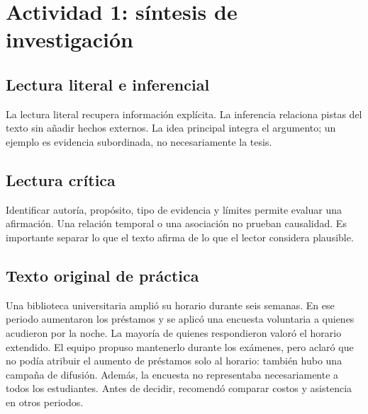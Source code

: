 \def\uadectitulo{Comprensión lectora}


\portadaUAdeC
\section{Actividad 1: síntesis de investigación}
\subsection{Lectura literal e inferencial}
La lectura literal recupera información explícita. La inferencia relaciona pistas del texto sin añadir hechos externos. La idea principal integra el argumento; un ejemplo es evidencia subordinada, no necesariamente la tesis.
\subsection{Lectura crítica}
Identificar autoría, propósito, tipo de evidencia y límites permite evaluar una afirmación. Una relación temporal o una asociación no prueban causalidad. Es importante separar lo que el texto afirma de lo que el lector considera plausible.
\subsection{Texto original de práctica}
Una biblioteca universitaria amplió su horario durante seis semanas. En ese periodo aumentaron los préstamos y se aplicó una encuesta voluntaria a quienes acudieron por la noche. La mayoría de quienes respondieron valoró el horario extendido. El equipo propuso mantenerlo durante los exámenes, pero aclaró que no podía atribuir el aumento de préstamos solo al horario: también hubo una campaña de difusión. Además, la encuesta no representaba necesariamente a todos los estudiantes. Antes de decidir, recomendó comparar costos y asistencia en otros periodos.
